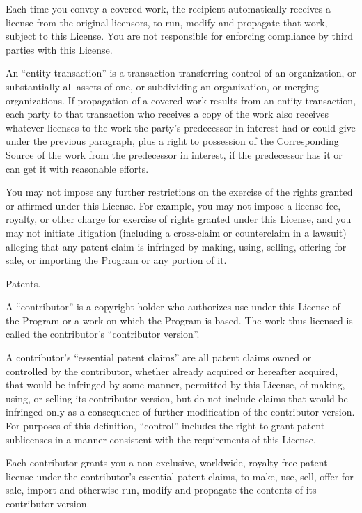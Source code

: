 Each time you convey a covered work, the recipient automatically receives a license from the original licensors, to run, modify and propagate that work, subject to this License.  You are not responsible for enforcing compliance by third parties with this License.

An ``entity transaction'' is a transaction transferring control of an organization, or substantially all assets of one, or subdividing an organization, or merging organizations.  If propagation of a covered work results from an entity transaction, each party to that transaction who receives a copy of the work also receives whatever licenses to the work the party's predecessor in interest had or could give under the previous paragraph, plus a right to possession of the Corresponding Source of the work from the predecessor in interest, if the predecessor has it or can get it with reasonable efforts.

You may not impose any further restrictions on the exercise of the rights granted or affirmed under this License.  For example, you may not impose a license fee, royalty, or other charge for exercise of rights granted under this License, and you may not initiate litigation (including a cross-claim or counterclaim in a lawsuit) alleging that any patent claim is infringed by making, using, selling, offering for sale, or importing the Program or any portion of it.

\item Patents.

A ``contributor'' is a copyright holder who authorizes use under this License of the Program or a work on which the Program is based.  The work thus licensed is called the contributor's ``contributor version''.

A contributor's ``essential patent claims'' are all patent claims owned or controlled by the contributor, whether already acquired or hereafter acquired, that would be infringed by some manner, permitted by this License, of making, using, or selling its contributor version, but do not include claims that would be infringed only as a consequence of further modification of the contributor version.  For purposes of this definition, ``control'' includes the right to grant patent sublicenses in a manner consistent with the requirements of this License.

Each contributor grants you a non-exclusive, worldwide, royalty-free patent license under the contributor's essential patent claims, to make, use, sell, offer for sale, import and otherwise run, modify and propagate the contents of its contributor version.

